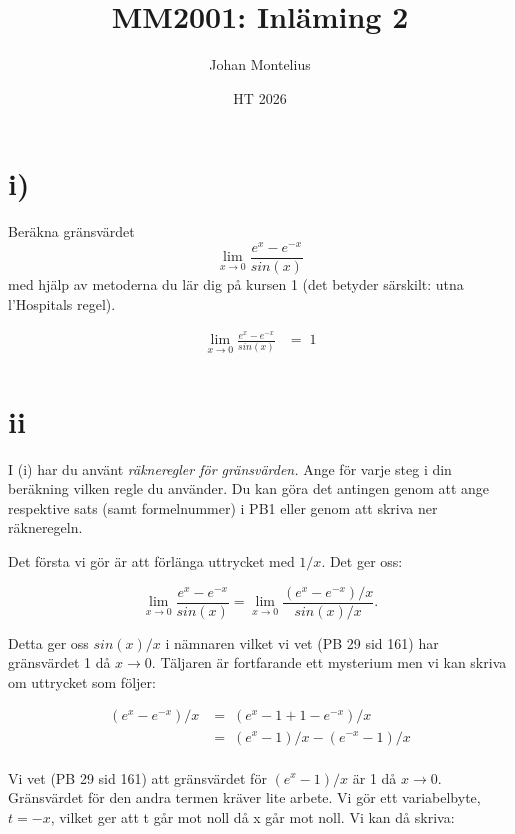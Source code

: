 \documentclass[a4paper, 11pt]{article}
\begin{document}
\title{
    \textbf{MM2001: Inläming 2}
}
\author{Johan Montelius}
\date{HT 2026}

\maketitle

\section*{i)}

Beräkna gränsvärdet
$$  \lim\limits_{x\to 0} \frac{e^x - e^{-x}}{sin(x)}$$
med hjälp av metoderna du lär dig på kursen 1 (det betyder särskilt:
utna l'Hospitals regel).

\begin{align*}
  \lim\limits_{x\to 0} \frac{e^x - e^{-x}}{sin(x)} &=\; 1 \\
\end{align*}



\section*{ii}

I (i) har du använt {\em räkneregler för gränsvärden.} Ange för varje
steg i din beräkning vilken regle du använder. Du kan göra det
antingen genom att ange respektive sats (samt formelnummer) i PB1
eller genom att skriva ner räkneregeln.

Det första vi gör är att förlänga uttrycket med $1/x$. Det ger oss:

$$
\lim\limits_{x\to 0}  \frac{e^x - e^{-x}}{sin(x)} =  \lim\limits_{x\to 0}  \frac{(e^x - e^{-x})/ x }{sin(x)/ x}.
$$

Detta ger oss $sin(x)/x$ i nämnaren vilket vi vet (PB 29 sid 161) har
gränsvärdet 1 då $x \rightarrow 0$. Täljaren är fortfarande ett
mysterium men vi kan skriva om uttrycket som följer:

\begin{align*}
  (e^x - e^{-x})/ x &=\; (e^x - 1 + 1 - e^{-x})/ x \\
                   &=\; (e^x - 1)/x - (e^{-x} - 1)/ x \\
\end{align*}

Vi vet (PB 29 sid 161) att gränsvärdet för $(e^x - 1)/x$ är 1 då
$x \rightarrow 0$. Gränsvärdet för den andra termen kräver lite arbete. Vi gör ett
variabelbyte, $t = -x$, vilket ger att t går mot noll då x går mot noll. Vi kan då skriva:
\end{document}
